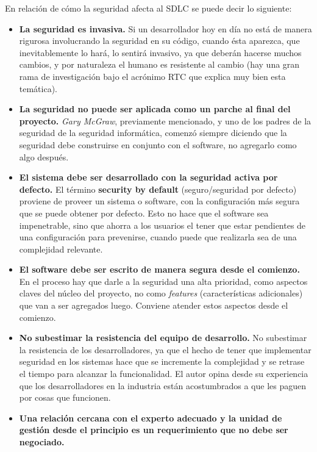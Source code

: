 En relación de cómo la seguridad afecta al SDLC se puede decir lo siguiente\cite{GaryMcGrawSoftwareSecurity}\cite{TheSDLCMicrosoft}\cite{SoftwarePenetrationTesting}\cite{Manicode:SSDLC}:
\begin{itemize}
\item \textbf{La seguridad es invasiva.} \newline Si un desarrollador hoy en día no está de manera rigurosa involucrando la seguridad en su código, cuando ésta aparezca, que inevitablemente lo hará, lo sentirá invasivo, ya que deberán hacerse muchos cambios, y por naturaleza el humano es resistente al cambio (hay una gran rama de investigación bajo el acrónimo RTC que explica muy bien esta temática).
\item \textbf{La seguridad no puede ser aplicada como un parche al final del proyecto.} \newline \textit{Gary McGraw}, previamente mencionado, y uno de los padres de la seguridad de la seguridad informática, comenzó siempre diciendo que la seguridad debe construirse en conjunto con el software, no agregarlo como algo después.
\item \textbf{El sistema debe ser desarrollado con la seguridad activa por defecto.} \newline El término \textbf{security by default} (seguro/seguridad por defecto) proviene de proveer un sistema o software, con la configuración más segura que se puede obtener por defecto. Esto no hace que el software sea impenetrable, sino que ahorra a los usuarios el tener que estar pendientes de una configuración para prevenirse, cuando puede que realizarla sea de una complejidad relevante.
\item \textbf{El software debe ser escrito de manera segura desde el comienzo.} \newline En el proceso hay que darle a la seguridad una alta prioridad, como aspectos claves del núcleo del proyecto, no como \textit{features} (características adicionales) que van a ser agregados luego. Conviene atender estos aspectos desde el comienzo. 
\item \textbf{No subestimar la resistencia del equipo de desarrollo.} \newline No subestimar la resistencia de los desarrolladores, ya que el hecho de tener que implementar seguridad en los sistemas hace que se incremente la complejidad y se retrase el tiempo para alcanzar la funcionalidad. El autor opina desde su experiencia que los desarrolladores en la industria están acostumbrados a que les paguen por cosas que funcionen.
\item \textbf{Una relación cercana con el experto adecuado y la unidad de gestión desde el principio es un requerimiento que no debe ser negociado.}
\end{itemize}

